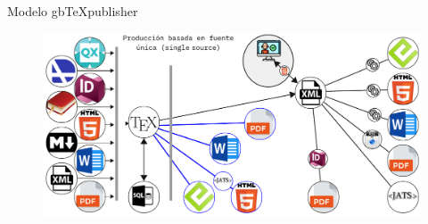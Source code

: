 \documentclass[14pt,aspectratio=169]{beamer}
\begin{document}


\begin{frame}{Modelo gbTeXpublisher}
	\begin{figure}
		\centering
		\includegraphics[width=.8\textwidth]{arbol4.pdf}
	\end{figure}
\end{frame}
\end{document}
